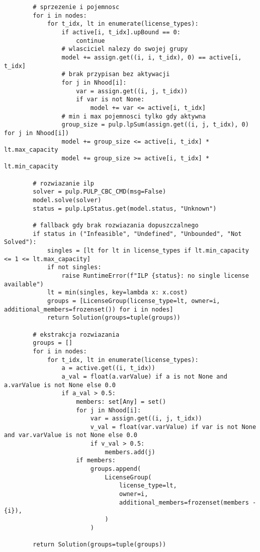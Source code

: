 {\begin{verbatim}
        # sprzezenie i pojemnosc
        for i in nodes:
            for t_idx, lt in enumerate(license_types):
                if active[i, t_idx].upBound == 0:
                    continue
                # wlasciciel nalezy do swojej grupy
                model += assign.get((i, i, t_idx), 0) == active[i, t_idx]
                # brak przypisan bez aktywacji
                for j in Nhood[i]:
                    var = assign.get((i, j, t_idx))
                    if var is not None:
                        model += var <= active[i, t_idx]
                # min i max pojemnosci tylko gdy aktywna
                group_size = pulp.lpSum(assign.get((i, j, t_idx), 0) for j in Nhood[i])
                model += group_size <= active[i, t_idx] * lt.max_capacity
                model += group_size >= active[i, t_idx] * lt.min_capacity

        # rozwiazanie ilp
        solver = pulp.PULP_CBC_CMD(msg=False)
        model.solve(solver)
        status = pulp.LpStatus.get(model.status, "Unknown")

        # fallback gdy brak rozwiazania dopuszczalnego
        if status in ("Infeasible", "Undefined", "Unbounded", "Not Solved"):
            singles = [lt for lt in license_types if lt.min_capacity <= 1 <= lt.max_capacity]
            if not singles:
                raise RuntimeError(f"ILP {status}: no single license available")
            lt = min(singles, key=lambda x: x.cost)
            groups = [LicenseGroup(license_type=lt, owner=i, additional_members=frozenset()) for i in nodes]
            return Solution(groups=tuple(groups))

        # ekstrakcja rozwiazania
        groups = []
        for i in nodes:
            for t_idx, lt in enumerate(license_types):
                a = active.get((i, t_idx))
                a_val = float(a.varValue) if a is not None and a.varValue is not None else 0.0
                if a_val > 0.5:
                    members: set[Any] = set()
                    for j in Nhood[i]:
                        var = assign.get((i, j, t_idx))
                        v_val = float(var.varValue) if var is not None and var.varValue is not None else 0.0
                        if v_val > 0.5:
                            members.add(j)
                    if members:
                        groups.append(
                            LicenseGroup(
                                license_type=lt,
                                owner=i,
                                additional_members=frozenset(members - {i}),
                            )
                        )

        return Solution(groups=tuple(groups))
\end{verbatim}
    }

